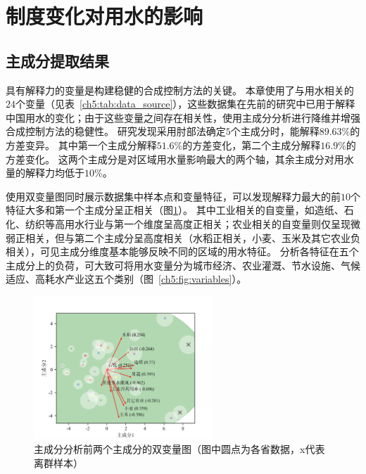 

\section{制度变化对用水的影响}

\subsection{主成分提取结果}

具有解释力的变量是构建稳健的合成控制方法的关键。
本章使用了与用水相关的$24$个变量（见表~\ref{ch5:tab:data_source}），这些数据集在先前的研究中已用于解释中国用水的变化\cite{zhou2020}；由于这些变量之间存在相关性，使用主成分分析进行降维并增强合成控制方法的稳健性。
研究发现采用肘部法确定$5$个主成分时，能解释$89.63\%$的方差变异。
其中第一个主成分解释$51.6\%$的方差变化，第二个主成分解释$16.9\%$的方差变化。
这两个主成分是对区域用水量影响最大的两个轴，其余主成分对用水量的解释力均低于$10\%$。


使用双变量图同时展示数据集中样本点和变量特征，可以发现解释力最大的前$10$个特征大多和第一个主成分呈正相关（图\ref{ch5:fig:biplot}）。
其中工业相关的自变量，如造纸、石化、纺织等高用水行业与第一个维度呈高度正相关；农业相关的自变量则仅呈现微弱正相关，但与第二个主成分呈高度相关（水稻正相关，小麦、玉米及其它农业负相关），可见主成分维度基本能够反映不同的区域的用水特征。
分析各特征在五个主成分上的负荷，可大致可将用水变量分为城市经济、农业灌溉、节水设施、气候适应、高耗水产业这五个类别（图~\ref{ch5:fig:variables}）。


\begin{figure}[!ht]
    \centering
    \includegraphics[width=0.6\textwidth]{img/ch5/ch5_biplot.png}
    \caption[主成分分析前两个主成分的双变量图]{主成分分析前两个主成分的双变量图（图中圆点为各省数据，x代表离群样本）}\label{ch5:fig:biplot}
\end{figure}


